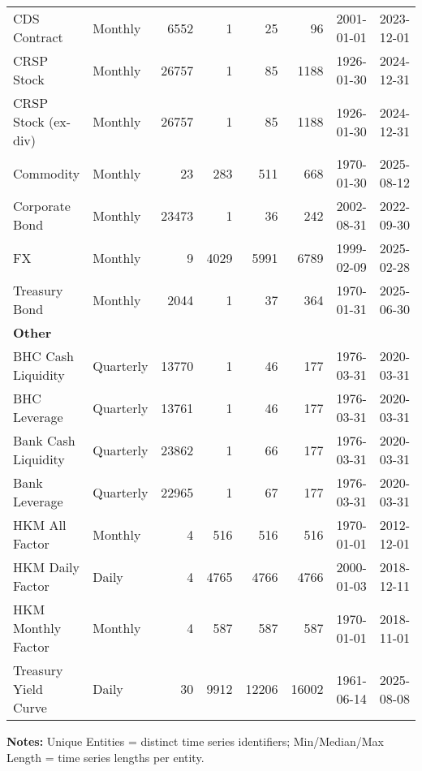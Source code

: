 \begin{table}[htbp]
\begin{tabular}{@{}llrrrrll@{}}
CDS Contract & Monthly & 6552 & 1 & 25 & 96 & 2001-01-01 & 2023-12-01 \\
CRSP Stock & Monthly & 26757 & 1 & 85 & 1188 & 1926-01-30 & 2024-12-31 \\
CRSP Stock (ex-div) & Monthly & 26757 & 1 & 85 & 1188 & 1926-01-30 & 2024-12-31 \\
Commodity & Monthly & 23 & 283 & 511 & 668 & 1970-01-30 & 2025-08-12 \\
Corporate Bond & Monthly & 23473 & 1 & 36 & 242 & 2002-08-31 & 2022-09-30 \\
FX & Monthly & 9 & 4029 & 5991 & 6789 & 1999-02-09 & 2025-02-28 \\
Treasury Bond & Monthly & 2044 & 1 & 37 & 364 & 1970-01-31 & 2025-06-30 \\
\midrule
\multicolumn{8}{l}{\textbf{Other}} \\
BHC Cash Liquidity & Quarterly & 13770 & 1 & 46 & 177 & 1976-03-31 & 2020-03-31 \\
BHC Leverage & Quarterly & 13761 & 1 & 46 & 177 & 1976-03-31 & 2020-03-31 \\
Bank Cash Liquidity & Quarterly & 23862 & 1 & 66 & 177 & 1976-03-31 & 2020-03-31 \\
Bank Leverage & Quarterly & 22965 & 1 & 67 & 177 & 1976-03-31 & 2020-03-31 \\
HKM All Factor & Monthly & 4 & 516 & 516 & 516 & 1970-01-01 & 2012-12-01 \\
HKM Daily Factor & Daily & 4 & 4765 & 4766 & 4766 & 2000-01-03 & 2018-12-11 \\
HKM Monthly Factor & Monthly & 4 & 587 & 587 & 587 & 1970-01-01 & 2018-11-01 \\
Treasury Yield Curve & Daily & 30 & 9912 & 12206 & 16002 & 1961-06-14 & 2025-08-08 \\
\bottomrule
\end{tabular}
\vspace{0.1cm}
\begin{minipage}{\textwidth}
\scriptsize
\textbf{Notes:} Unique Entities = distinct time series identifiers; Min/Median/Max Length = time series lengths per entity.
\end{minipage}
\end{table}